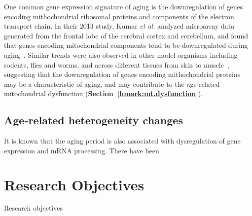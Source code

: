 One common gene expression signature of aging is the downregulation of genes encoding mithochondrial ribosomal proteins and components of the electron transport chain.
In their 2013 study, Kumar \textit{et al.} analyzed microarray data generated from the frontal lobe of the cerebral cortex and cerebellum,
and found that genes encoding mitochondrial components tend to be downregulated during aging~\cite{Kumar2013}.
Similar trends were also observed in other model organisms including rodents, flies and worms, and across different tissues from skin to muscle~\cite{Frenk2018},
suggesting that the downregulation of genes encoding mithochondrial proteins may be a characteristic of aging, 
and may contribute to the age-related mitochondrial dysfunction (\textbf{Section~\ref{hmark:mt.dysfunction}}).




\subsection{Age-related heterogeneity changes}
It is known that the aging period is also associated with dysregulation of gene expression and mRNA processing.
There have been 


\section{Research Objectives}
Research objectives



